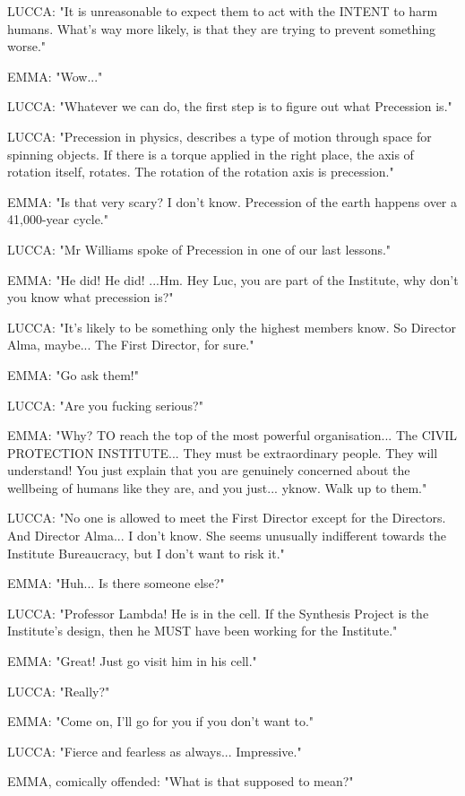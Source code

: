 \documentclass[11pt]{article}
\begin{document}
LUCCA: "It is unreasonable to expect them to act with the INTENT to harm humans. 
What's way more likely, is that they are trying to prevent something worse."

EMMA: "Wow..."

LUCCA: "Whatever we can do, the first step is to figure out what Precession is."

LUCCA: "Precession in physics, describes a type of motion through space for spinning objects.
If there is a torque applied in the right place, the axis of rotation itself, rotates.
The rotation of the rotation axis is precession."

EMMA: "Is that very scary? I don't know.
Precession of the earth happens over a 41,000-year cycle."

LUCCA: "Mr Williams spoke of Precession in one of our last lessons."

EMMA: "He did! He did!
...Hm. Hey Luc, you are part of the Institute, why don't you know what precession is?"

LUCCA: "It's likely to be something only the highest members know.
So Director Alma, maybe...
The First Director, for sure."

EMMA: "Go ask them!"

LUCCA: "Are you fucking serious?"

EMMA: "Why? 
TO reach the top of the most powerful organisation... The CIVIL PROTECTION INSTITUTE... They must be extraordinary people.
They will understand!
You just explain that you are genuinely concerned about the wellbeing of humans like they are, and you just... yknow. 
Walk up to them."

LUCCA: "No one is allowed to meet the First Director except for the Directors. 
And Director Alma...
I don't know. 
She seems unusually indifferent towards the Institute Bureaucracy, but I don't want to risk it."

EMMA: "Huh... Is there someone else?"

LUCCA: "Professor Lambda! He is in the cell. 
If the Synthesis Project is the Institute's design, then he MUST have been working for the Institute."

EMMA: "Great! Just go visit him in his cell."

LUCCA: "Really?"

EMMA: "Come on, I'll go for you if you don't want to."

LUCCA: "Fierce and fearless as always... Impressive."

EMMA, comically offended: "What is that supposed to mean?"
\end{document}
